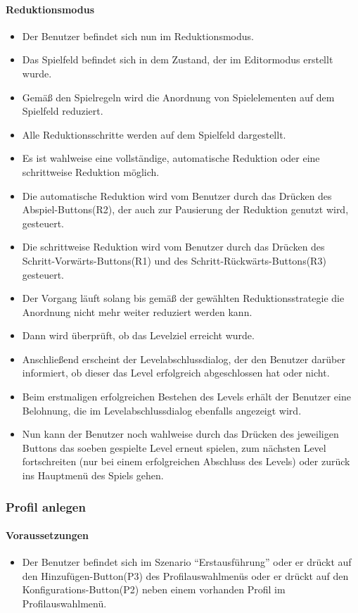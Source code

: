 \paragraph{Reduktionsmodus}
\begin{itemize}
	\item Der Benutzer befindet sich nun im Reduktionsmodus.
	\item Das Spielfeld befindet sich in dem Zustand, der im Editormodus erstellt wurde.
	\item Gemäß den Spielregeln wird die Anordnung von Spielelementen auf dem Spielfeld reduziert.
	\item Alle Reduktionsschritte werden auf dem Spielfeld dargestellt.
	\item Es ist wahlweise eine vollständige, automatische Reduktion oder eine schrittweise Reduktion möglich.
	\item Die automatische Reduktion wird vom Benutzer durch das Drücken des Abspiel-Buttons(R2), der auch zur Pausierung der Reduktion genutzt wird, gesteuert.
	\item Die schrittweise Reduktion wird vom Benutzer durch das Drücken des Schritt-Vorwärts-Buttons(R1) und des Schritt-Rückwärts-Buttons(R3) gesteuert.
	\item Der Vorgang läuft solang bis gemäß der gewählten Reduktionsstrategie die Anordnung nicht mehr weiter reduziert werden kann.
	\item Dann wird überprüft, ob das Levelziel erreicht wurde.
	\item Anschließend erscheint der Levelabschlussdialog, der den Benutzer darüber informiert, ob dieser das Level erfolgreich abgeschlossen hat oder nicht.
	\item Beim erstmaligen erfolgreichen Bestehen des Levels erhält der Benutzer eine Belohnung, die im Levelabschlussdialog ebenfalls angezeigt wird.
	\item Nun kann der Benutzer noch wahlweise durch das Drücken des jeweiligen Buttons das soeben gespielte Level erneut spielen, zum nächsten Level fortschreiten (nur bei einem erfolgreichen Abschluss des Levels) oder zurück ins Hauptmenü des Spiels gehen.
\end{itemize}

\subsubsection{Profil anlegen}
\paragraph{Voraussetzungen}
\begin{itemize}
	\item Der Benutzer befindet sich im Szenario "`Erstausführung"' oder er drückt auf den Hinzufügen-Button(P3) des Profilauswahlmenüs oder er drückt auf den Konfigurations-Button(P2) neben einem vorhanden Profil im Profilauswahlmenü.
\end{itemize}
